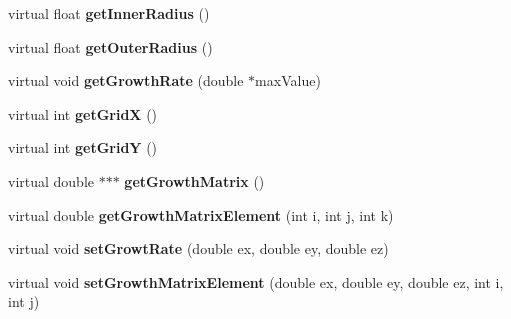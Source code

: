 \begin{DoxyCompactItemize}
\item 
\hypertarget{classGrowthFunctionBase_a05ace7e6cb21566ad03e72e56962d58b}{}virtual float {\bfseries get\+Inner\+Radius} ()\label{classGrowthFunctionBase_a05ace7e6cb21566ad03e72e56962d58b}

\item 
\hypertarget{classGrowthFunctionBase_a2ba8f7659e1c0546998671458943233d}{}virtual float {\bfseries get\+Outer\+Radius} ()\label{classGrowthFunctionBase_a2ba8f7659e1c0546998671458943233d}

\item 
\hypertarget{classGrowthFunctionBase_a9598654cae114f6b443167898ac4d095}{}virtual void {\bfseries get\+Growth\+Rate} (double $\ast$max\+Value)\label{classGrowthFunctionBase_a9598654cae114f6b443167898ac4d095}

\item 
\hypertarget{classGrowthFunctionBase_a1dfd024db9bf627777741c68f7b5ddf2}{}virtual int {\bfseries get\+Grid\+X} ()\label{classGrowthFunctionBase_a1dfd024db9bf627777741c68f7b5ddf2}

\item 
\hypertarget{classGrowthFunctionBase_a1445bfc812abb72fd6757859aa302feb}{}virtual int {\bfseries get\+Grid\+Y} ()\label{classGrowthFunctionBase_a1445bfc812abb72fd6757859aa302feb}

\item 
\hypertarget{classGrowthFunctionBase_a067bdcd836e7196ce5cfc9120b9499c1}{}virtual double $\ast$$\ast$$\ast$ {\bfseries get\+Growth\+Matrix} ()\label{classGrowthFunctionBase_a067bdcd836e7196ce5cfc9120b9499c1}

\item 
\hypertarget{classGrowthFunctionBase_a4e40d019aff99e72b1aee79d93c8e9a0}{}virtual double {\bfseries get\+Growth\+Matrix\+Element} (int i, int j, int k)\label{classGrowthFunctionBase_a4e40d019aff99e72b1aee79d93c8e9a0}

\item 
\hypertarget{classGrowthFunctionBase_abcfbd2e1fbad91b3f9002ef7fc7625e5}{}virtual void {\bfseries set\+Growt\+Rate} (double ex, double ey, double ez)\label{classGrowthFunctionBase_abcfbd2e1fbad91b3f9002ef7fc7625e5}

\item 
\hypertarget{classGrowthFunctionBase_a29781080624a8ab028af36f3326b6240}{}virtual void {\bfseries set\+Growth\+Matrix\+Element} (double ex, double ey, double ez, int i, int j)\label{classGrowthFunctionBase_a29781080624a8ab028af36f3326b6240}

\end{DoxyCompactItemize}
